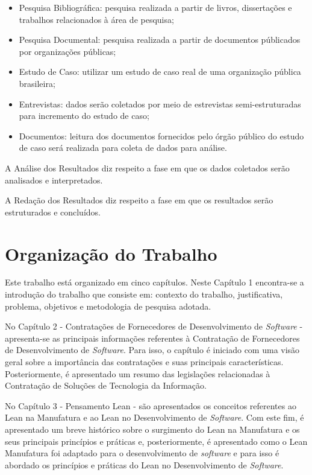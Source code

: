 \begin{itemize}
\item Pesquisa Bibliográfica: pesquisa realizada a partir de livros, dissertações e trabalhos relacionados à área de pesquisa;
\item Pesquisa Documental: pesquisa realizada a partir de documentos públicados por organizações públicas;
\item Estudo de Caso: utilizar um estudo de caso real de uma organização pública brasileira;
\item Entrevistas: dados serão coletados por meio de estrevistas semi-estruturadas para incremento do estudo de caso;
\item Documentos: leitura dos documentos fornecidos pelo órgão público do estudo de caso será realizada para coleta de dados para análise.
\end{itemize}

A Análise dos Resultados diz respeito a fase em que os dados coletados serão analisados e interpretados.

A Redação dos Resultados diz respeito a fase em que os resultados serão estruturados e concluídos.

\section[Organização do Trabalho]{Organização do Trabalho}

Este trabalho está organizado em cinco capítulos. Neste Capítulo 1 encontra-se a introdução do trabalho que consiste em: contexto do trabalho,  justificativa,  problema, objetivos e metodologia de pesquisa adotada.

No Capítulo 2 - Contratações de Fornecedores de Desenvolvimento de \textit{Software} - apresenta-se as principais informações referentes à Contratação de Fornecedores de Desenvolvimento de \textit{Software}. Para isso, o capítulo é iniciado com uma visão geral sobre a importância das contratações e suas principais características. Posteriormente, é apresentado um resumo das legislações relacionadas à Contratação de Soluções de Tecnologia da Informação.

No Capítulo 3 - Pensamento Lean - são apresentados os conceitos referentes ao Lean na Manufatura e ao Lean no Desenvolvimento de \textit{Software}. Com este fim, é apresentado um breve histórico sobre o surgimento do Lean na Manufatura e os seus principais princípios e práticas e, posteriormente, é apresentado como o Lean Manufatura foi adaptado para o desenvolvimento de \textit{software} e para isso é abordado os princípios e práticas do Lean no Desenvolvimento de \textit{Software}.

